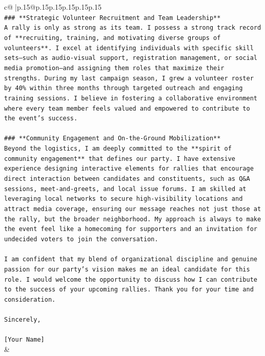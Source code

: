 \documentclass{article}
\begin{document}
{\begin{supertabular}{c@{$\;$}|p{.15\linewidth}@{}p{.15\linewidth}p{.15\linewidth}p{.15\linewidth}p{.15\linewidth}p{.15\linewidth}}
{{{\\ 
\texttt{\#\#\# **Strategic Volunteer Recruitment and Team Leadership**} \\
\texttt{A rally is only as strong as its team. I possess a strong track record of **recruiting, training, and motivating diverse groups of volunteers**. I excel at identifying individuals with specific skill sets—such as audio{-}visual support, registration management, or social media promotion—and assigning them roles that maximize their strengths. During my last campaign season, I grew a volunteer roster by 40\% within three months through targeted outreach and engaging training sessions. I believe in fostering a collaborative environment where every team member feels valued and empowered to contribute to the event's success.} \\
\\ 
\texttt{\#\#\# **Community Engagement and On{-}the{-}Ground Mobilization**} \\
\texttt{Beyond the logistics, I am deeply committed to the **spirit of community engagement** that defines our party. I have extensive experience designing interactive elements for rallies that encourage direct interaction between candidates and constituents, such as Q\&A sessions, meet{-}and{-}greets, and local issue forums. I am skilled at leveraging local networks to secure high{-}visibility locations and attract media coverage, ensuring our message reaches not just those at the rally, but the broader neighborhood. My approach is always to make the event feel like a homecoming for supporters and an invitation for undecided voters to join the conversation.} \\
\\ 
\texttt{I am confident that my blend of organizational discipline and genuine passion for our party's vision makes me an ideal candidate for this role. I would welcome the opportunity to discuss how I can contribute to the success of your upcoming rallies. Thank you for your time and consideration.} \\
\\ 
\texttt{Sincerely,} \\
\\ 
\texttt{{[}Your Name{]}} \\
            }
        }
    }
    & \\ \\


\end{supertabular}}
\end{document}
